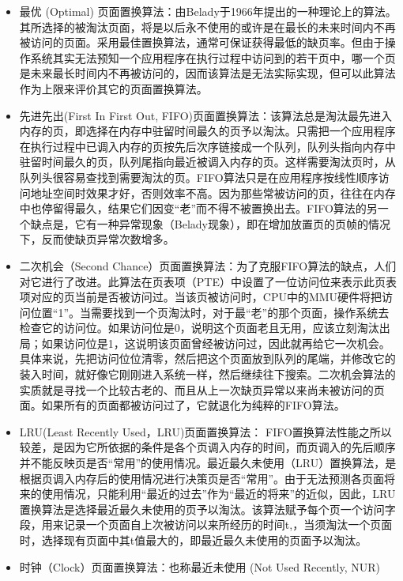 \begin{itemize}
\item
  最优 (Optimal)
  页面置换算法：由Belady于1966年提出的一种理论上的算法。其所选择的被淘汰页面，将是以后永不使用的或许是在最长的未来时间内不再被访问的页面。采用最佳置换算法，通常可保证获得最低的缺页率。但由于操作系统其实无法预知一个应用程序在执行过程中访问到的若干页中，哪一个页是未来最长时间内不再被访问的，因而该算法是无法实际实现，但可以此算法作为上限来评价其它的页面置换算法。
\item
  先进先出(First In First Out,
  FIFO)页面置换算法：该算法总是淘汰最先进入内存的页，即选择在内存中驻留时间最久的页予以淘汰。只需把一个应用程序在执行过程中已调入内存的页按先后次序链接成一个队列，队列头指向内存中驻留时间最久的页，队列尾指向最近被调入内存的页。这样需要淘汰页时，从队列头很容易查找到需要淘汰的页。FIFO算法只是在应用程序按线性顺序访问地址空间时效果才好，否则效率不高。因为那些常被访问的页，往往在内存中也停留得最久，结果它们因变``老''而不得不被置换出去。FIFO算法的另一个缺点是，它有一种异常现象（Belady现象），即在增加放置页的页帧的情况下，反而使缺页异常次数增多。
\item
  二次机会（Second
  Chance）页面置换算法：为了克服FIFO算法的缺点，人们对它进行了改进。此算法在页表项（PTE）中设置了一位访问位来表示此页表项对应的页当前是否被访问过。当该页被访问时，CPU中的MMU硬件将把访问位置``1''。当需要找到一个页淘汰时，对于最``老''的那个页面，操作系统去检查它的访问位。如果访问位是0，说明这个页面老且无用，应该立刻淘汰出局；如果访问位是1，这说明该页面曾经被访问过，因此就再给它一次机会。具体来说，先把访问位位清零，然后把这个页面放到队列的尾端，并修改它的装入时间，就好像它刚刚进入系统一样，然后继续往下搜索。二次机会算法的实质就是寻找一个比较古老的、而且从上一次缺页异常以来尚未被访问的页面。如果所有的页面都被访问过了，它就退化为纯粹的FIFO算法。
\item
  LRU(Least Recently Used，LRU)页面置换算法：
  FIFO置换算法性能之所以较差，是因为它所依据的条件是各个页调入内存的时间，而页调入的先后顺序并不能反映页是否``常用''的使用情况。最近最久未使用（LRU）置换算法，是根据页调入内存后的使用情况进行决策页是否``常用''。由于无法预测各页面将来的使用情况，只能利用``最近的过去''作为``最近的将来''的近似，因此，LRU置换算法是选择最近最久未使用的页予以淘汰。该算法赋予每个页一个访问字段，用来记录一个页面自上次被访问以来所经历的时间t,，当须淘汰一个页面时，选择现有页面中其t值最大的，即最近最久未使用的页面予以淘汰。
\item
  时钟（Clock）页面置换算法：也称最近未使用 (Not Used Recently, NUR)

\end{itemize}
